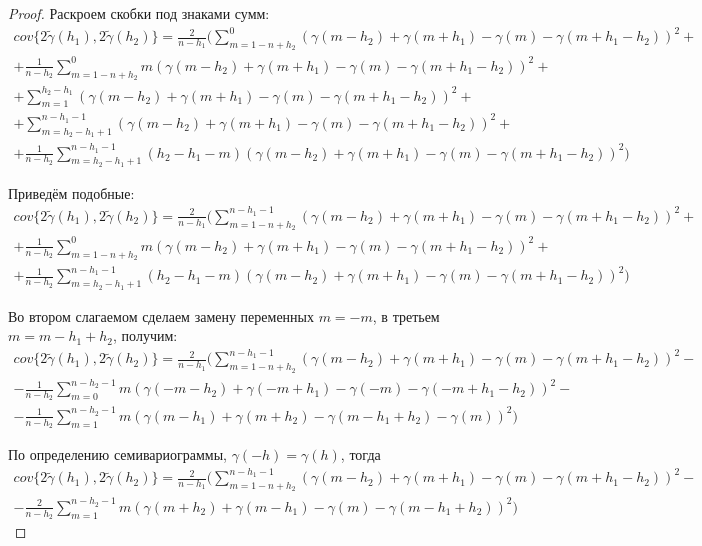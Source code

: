 \begin{proof}
Раскроем скобки под знаками сумм:
\begin{multline*}
	cov\{ 2 \tilde{\gamma}(h_1), 2 \tilde{\gamma}(h_2) \} = \frac{2}{n - h_1} (\sum_{m = 1 - n + h_2}^{0} (\gamma(m - h_2) + \gamma(m + h_1) - \gamma(m) - \gamma(m + h_1 - h_2))^2 + \\
	+ \frac{1}{n - h_2} \sum_{m = 1 - n + h_2}^{0} m (\gamma(m - h_2) + \gamma(m + h_1) - \gamma(m) - \gamma(m + h_1 - h_2))^2 + \\
	+ \sum_{m = 1}^{h_2 - h_1}(\gamma(m - h_2) + \gamma(m + h_1) - \gamma(m) - \gamma(m + h_1 - h_2))^2 + \\
	+ \sum_{m = h_2 - h_1 + 1}^{n - h_1 - 1}(\gamma(m - h_2) + \gamma(m + h_1) - \gamma(m) - \gamma(m + h_1 - h_2))^2 + \\
	+ \frac{1}{n - h_2} \sum_{m = h_2 - h_1 + 1}^{n - h_1 - 1} (h_2 - h_1 -m) (\gamma(m - h_2) + \gamma(m + h_1) - \gamma(m) - \gamma(m + h_1 - h_2))^2)
\end{multline*}

Приведём подобные:
\begin{multline*}
	cov\{ 2 \tilde{\gamma}(h_1), 2 \tilde{\gamma}(h_2) \} = \frac{2}{n - h_1} (\sum_{m = 1 - n + h_2}^{n - h_1 - 1} (\gamma(m - h_2) + \gamma(m + h_1) - \gamma(m) - \gamma(m + h_1 - h_2))^2 + \\
	+ \frac{1}{n - h_2} \sum_{m = 1 - n + h_2}^{0} m (\gamma(m - h_2) + \gamma(m + h_1) - \gamma(m) - \gamma(m + h_1 - h_2))^2 + \\
	+ \frac{1}{n - h_2} \sum_{m = h_2 - h_1 + 1}^{n - h_1 - 1} (h_2 - h_1 - m) (\gamma(m - h_2) + \gamma(m + h_1) - \gamma(m) - \gamma(m + h_1 - h_2))^2)
\end{multline*}

Во втором слагаемом сделаем замену переменных $ m = -m $, в третьем $ m = m - h_1 + h_2 $, получим:
\begin{multline*}
	cov\{ 2 \tilde{\gamma}(h_1), 2 \tilde{\gamma}(h_2) \} = \frac{2}{n - h_1} (\sum_{m = 1 - n + h_2}^{n - h_1 - 1} (\gamma(m - h_2) + \gamma(m + h_1) - \gamma(m) - \gamma(m + h_1 - h_2))^2 - \\
	- \frac{1}{n - h_2} \sum_{m = 0}^{n - h_2 - 1} m (\gamma(-m - h_2) + \gamma(-m + h_1) - \gamma(-m) - \gamma(-m + h_1 - h_2))^2 - \\
	- \frac{1}{n - h_2} \sum_{m = 1}^{n - h_2 - 1} m (\gamma(m - h_1) + \gamma(m + h_2) - \gamma(m - h_1 + h_2) - \gamma(m))^2)
\end{multline*}

По определению семивариограммы, $ \gamma(-h) = \gamma(h) $, тогда
\begin{multline}
\label{eq:cov2}
	cov\{ 2 \tilde{\gamma}(h_1), 2 \tilde{\gamma}(h_2) \} = \frac{2}{n - h_1} (\sum_{m = 1 - n + h_2}^{n - h_1 - 1} (\gamma(m - h_2) + \gamma(m + h_1) - \gamma(m) - \gamma(m + h_1 - h_2))^2 - \\
	- \frac{2}{n - h_2} \sum_{m = 1}^{n - h_2 - 1} m (\gamma(m + h_2) + \gamma(m - h_1) - \gamma(m) - \gamma(m - h_1 + h_2))^2)
\end{multline}


\end{proof}
